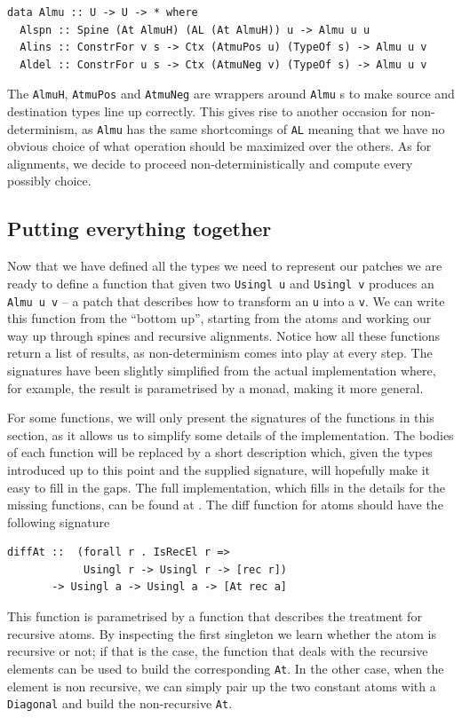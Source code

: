 \documentclass[11pt, titlepage]{article}
\newcommand{\toHaskell}[1]{\texttt{#1}\xspace}
\begin{document}
\begin{verbatim}
data Almu :: U -> U -> * where
  Alspn :: Spine (At AlmuH) (AL (At AlmuH)) u -> Almu u u
  Alins :: ConstrFor v s -> Ctx (AtmuPos u) (TypeOf s) -> Almu u v
  Aldel :: ConstrFor u s -> Ctx (AtmuNeg v) (TypeOf s) -> Almu u v
\end{verbatim}

The \toHaskell{AlmuH}, \toHaskell{AtmuPos} and \toHaskell{AtmuNeg} are wrappers around \toHaskell{Almu}s to make source and destination types line up correctly.
This gives rise to another occasion for non-determinism, as \texttt{Almu} has 
the same shortcomings of \texttt{AL} meaning that we have no obvious choice of 
what operation should be maximized over the others. As for alignments, we decide to proceed non-deterministically
and compute every possibly choice. 

\subsection{Putting everything together}\label{putting everything together}

Now that we have defined all the types we need to represent our patches we are ready to define a function that given two \toHaskell{Usingl u} and \toHaskell{Usingl v} produces an \toHaskell{Almu u v} -- a patch that describes how to transform an \toHaskell{u} into a \toHaskell{v}.
We can write this function from the ``bottom up'', starting from the atoms and working our way up through spines and recursive alignments. 
Notice how all these functions return a list of results, as non-determinism comes into play at every step. The signatures have been slightly simplified from the actual implementation where, for example, the result is parametrised by a monad, making it more general.

For some functions, we will only present the signatures of the functions in this section, as it allows us to simplify some details of the implementation. The bodies of each function will be replaced by a short description which, given the types introduced up to this point and the supplied signature, will hopefully make it easy to fill in the gaps.  The full implementation, which fills in the details for the missing functions, can be found at \cite{repo}. 
The diff function for atoms should have the following signature
\begin{verbatim}
diffAt ::  (forall r . IsRecEl r => 
            Usingl r -> Usingl r -> [rec r])
       -> Usingl a -> Usingl a -> [At rec a]
\end{verbatim}
This function is parametrised by a function that describes the treatment for 
recursive atoms. By inspecting the first singleton we learn whether the atom is 
recursive or not; if that is the case, the function that deals with the 
recursive elements can be used to build the corresponding \texttt{At}. In the 
other case, when the element is non recursive, we can simply pair up the two 
constant atoms with a \texttt{Diagonal} and build the non-recursive \texttt{At}.
\end{document}
